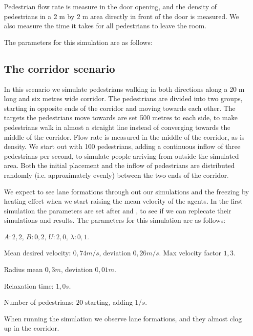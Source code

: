 Pedestrian flow rate is measure in the door opening, and the density of pedestrians in a 2 m by 2 m area directly in front of the door is measured. We also measure the time it takes for all pedestrians to leave the room.

The parameters for this simulation are as follows:



\subsection{The corridor scenario}
In this scenario we simulate pedestrians walking in both directions along a 20 
m long and six metres wide corridor. The pedestrians are divided into two 
groups, starting in opposite ends of the corridor and moving towards each 
other. The targets the pedestrians move towards are set 500 metres to each 
side, to make pedestrians walk in almost a straight line instead of converging 
towards the middle of the corridor. Flow rate is measured in the middle of the 
corridor, as is density. We start out with 100 pedestrians, adding a 
continuous inflow of three pedestrians per second, to simulate people arriving 
from outside the simulated area. Both the initial placement and the inflow of 
pedestrians are distributed randomly (i.e. approximately evenly) between the 
two ends of the corridor.

We expect to see lane formations through out our simulations
and the freezing by heating effect when we start raising the mean velocity
of the agents.
In the first simulation the parameters are set after \cite{ABconstant} and
\cite{self-org}, to see if we can replecate their simulations and results.
The parameters for this simulation are as follows:

\begin{itemize*}
    \item $A: 2,2$, $B: 0,2$, $U: 2,0$, $\lambda: 0,1$.
    \item Mean desired velocity: $0,74 m/s$, deviation $0,26 m/s$. Max 
        velocity factor $1,3$.
    \item Radius mean $0,3 m$, deviation $0,01 m$.
    \item Relaxation time: $1,0 s$.
    \item Number of pedestrians: $20$ starting, adding $1/s$.
\end{itemize*}

When running the simulation we observe lane formations, and they almost clog up
in the corridor.

